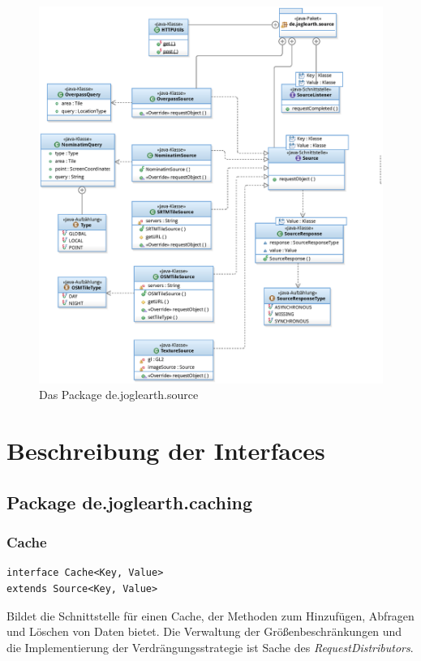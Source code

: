 \documentclass[10pt]{scrreprt}
\begin{document}
\begin{figure}[!htb]
\begin{center}
	\includegraphics[scale=0.55]{de_joglearth_source.eps}
\end{center}
\caption{Das Package de.joglearth.source}
\end{figure}



\chapter{Beschreibung der Interfaces}

\section{Package de.joglearth.caching}
\subsection*{Cache}
\begin{lstlisting}
interface Cache<Key, Value>
extends Source<Key, Value>
\end{lstlisting}
Bildet die Schnittstelle für einen Cache, der Methoden zum Hinzufügen, Abfragen und Löschen von Daten bietet. Die Verwaltung der Größenbeschränkungen und die Implementierung der Verdrängungsstrategie ist Sache des \textit{RequestDistributors}.\\
\end{document}
